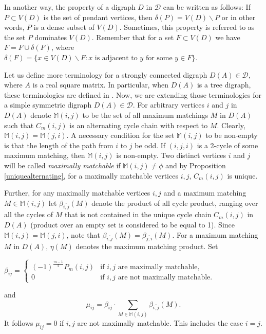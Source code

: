 \documentclass[notitlepage,12pt,reqno]{amsart}
\numberwithin{equation}{section}
\begin{document}
In another way, the property of a digraph $D$ in $\mathcal{D}$ can be written as follows: If $P\subset V(D)$ is the set of pendant vertices, then $\delta (P)=V(D)\backslash P$ or in other words, $P$ is a dense subset of $V(D)$. Sometimes, this property is referred to as the set $P$ dominates $V(D)$. Remember that for a set $F\subset V(D)$ we have $\overline{F}=F\cup \delta (F)$, where $\delta (F)=\{x\in V(D)\backslash F: x \mbox{ is adjacent to } y \mbox{ for some } y\in F\}$.

Let us define more terminology for a strongly connected digraph $D(A)\in \mathcal{D}$, where $A$ is a real square matrix. In particular, when $D(A)$ is a tree digraph, these terminologies are defined in \cite{nandi}. Now, we are extending those terminologies for a simple symmetric digraph $D(A)\in \mathcal{D}$. For arbitrary vertices $i$ and $j$ in $D(A)$ denote $\mathbb{M}(i,j)$ to be the set of all maximum matchings $M$ in $D(A)$ such that $C_m(i,j)$ is an alternating cycle chain with respect to $M$. Clearly, $\mathbb{M}(i,j)=\mathbb{M}(j,i)$. A necessary condition for the set $\mathbb{M}(i,j)$ to be non-empty is that the length of the path from $i$ to $j$ be odd. If $(i,j,i)$ is a 2-cycle of some maximum matching, then $\mathbb{M}(i,j)$ is non-empty. Two distinct vertices $i$ and $j$ will be called {\it maximally matchable} if $\mathbb{M}(i,j)\neq \phi$ and by Proposition \ref{uniquealternating}, for a maximally matchable vertices $i,j$, $C_m(i,j)$ is unique.

Further, for any maximally matchable vertices $i,j$ and a maximum matching $M\in \mathbb{M}(i,j)$ let $\beta _{\overline{i,j}}(M)$ denote the product of all cycle product, ranging over all the cycles of $M$ that is not contained in the unique cycle chain $C_m(i,j)$ in $D(A)$ (product over an empty set is considered to be equal to 1). Since $\mathbb{M}(i,j)=\mathbb{M}(j,i)$, note that $\beta _{\overline{i,j}}(M)=\beta _{\overline{j,i}}(M)$. For a maximum matching $M$ in $D(A)$, $\eta (M)$ denotes the maximum matching product. Set 
\begin{center}
$\beta _{ij}=\left\{\begin{array}{cl} (-1)^{\frac{m-1}{2}}P_m(i,j)&\mbox{if }i,j\mbox{ are maximally matchable, }\\0&\mbox{if }i,j\mbox{ are not maximally matchable. }\end{array}\right.$    
\end{center}
and
\begin{equation}\label{mu}
\mu _{ij}=\beta _{ij} \cdot \sum _{M\in \mathbb{M}(i,j)}\beta _{\overline{i,j}}(M).   
\end{equation}
It follows $\mu _{ij}=0$ if $i,j$ are not maximally matchable. This includes the case $i=j$.
\end{document}
